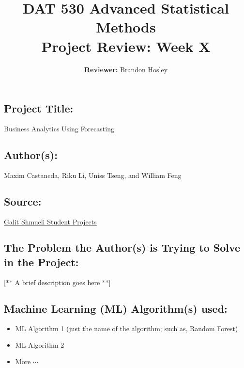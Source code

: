 \documentclass[]{article}
\title{\textbf{DAT 530 Advanced Statistical Methods}\\
	\normalsize{Project Review: Week X} }
\author{\textbf{Reviewer: }
	Brandon Hosley}
\begin{document}
\setlength{\droptitle}{-10em} 
\pretitle{\begin{flushleft}\LARGE} %
	\posttitle{\end{flushleft}}
\preauthor{\begin{flushleft}\large} %
	\postauthor{\end{flushleft}}
\predate{\begin{flushleft}\large} %
	\postdate{\end{flushleft}}
\maketitle

\vspace{-2em}

\subsection*{Project Title:}
Business Analytics Using Forecasting

\subsection*{Author(s):}
 Maxim Castaneda, Riku Li, Uniss Tseng, and William Feng

\subsection*{Source:}
\href{https://www.galitshmueli.com/data-mining-project/enhancing-supply-chain-efficiency-through-demand-forecasting-nivea}{Galit Shmueli Student Projects}

\subsection*{The Problem the Author(s) is Trying to Solve in the Project:}
[** A brief description goes here **]

\subsection*{Machine Learning (ML) Algorithm(s) used:}
\begin{itemize}
	\item ML Algorithm 1 (just the name of the algorithm; such as, Random Forest)
	\item ML Algorithm 2
	\item More $\cdots$
\end{itemize}
\end{document}
